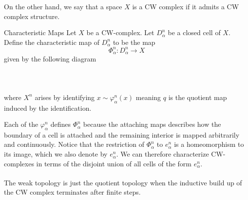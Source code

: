 \documentclass[a4paper]{article}
\begin{document}
On the other hand, we say that a space $X$ is a CW complex if it admits a CW complex structure. 

\begin{defn}{Characteristic Maps}{} Let $X$ be a CW-complex. Let $D_\alpha^n$ be a closed cell of $X$. Define the characteristic map of $D_\alpha^n$ to be the map $$\Phi_\alpha^n:D_\alpha^n\to X$$ given by the following diagram \\~\\
\\~\\
where $X^n$ arises by identifying $x\sim\varphi_\alpha^n(x)$ meaning $q$ is the quotient map induced by the identification. 
\end{defn}

Each of the $\varphi_\alpha^n$ defines $\Phi_\alpha^n$ because the attaching maps describes how the boundary of a cell is attached and the remaining interior is mapped arbitrarily and continuously. Notice that the restriction of $\Phi_\alpha^n$ to $e_\alpha^n$ is a homeomorphism to its image, which we also denote by $e_\alpha^n$. We can therefore characterize CW-complexes in terms of the disjoint union of all cells of the form $e_\alpha^n$. \\~\\

The weak topology is just the quotient topology when the inductive build up of the CW complex terminates after finite steps. 
\end{document}
